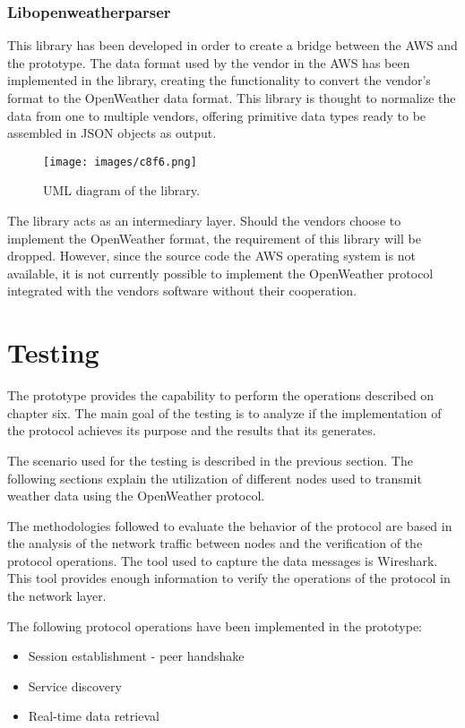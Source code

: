 \subsubsection{Libopenweatherparser}

This library has been developed in order to create a bridge between the \gls{AWS} and the prototype. The data format used by the vendor in the \gls{AWS} has been implemented in the library, creating the functionality to convert the vendor's format to the OpenWeather data format. This library is thought to normalize the data from one to multiple vendors, offering primitive data types ready to be assembled in \gls{JSON} objects as output.

\begin{figure}[H]
\centerline{\texttt{[image: images/c8f6.png]}}
\caption{\protect \gls{UML} diagram of the library.}
\end{figure}

The library acts as an intermediary layer. Should the vendors choose to implement the OpenWeather format, the requirement of this library will be dropped. However, since the source code the \gls{AWS} operating system is not available, it is not currently possible to implement the OpenWeather protocol integrated with the vendors software without their cooperation.

\section{Testing}
The prototype provides the capability to perform the operations described on chapter six. The main goal of the testing is to analyze if the implementation of the protocol achieves its purpose and the results that its generates.

The scenario used for the testing is described in the previous section. The following sections explain the utilization of different nodes used to transmit weather data using the OpenWeather protocol.

The methodologies followed to evaluate the behavior of the protocol are based in the analysis of the network traffic between nodes and the verification of the protocol operations. The tool used to capture the data messages is Wireshark\cite{WIRESHARK}. This tool provides enough information to verify the operations of the protocol in the network layer.

The following protocol operations have been implemented in the prototype:

\begin{itemize}
\item Session establishment - peer handshake
\item Service discovery
\item Real-time data retrieval
\end{itemize}

